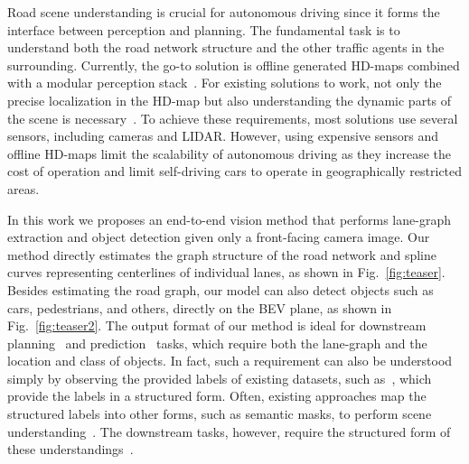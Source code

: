 \documentclass[10pt,twocolumn,letterpaper]{article}
\begin{document}
Road scene understanding is crucial for autonomous driving since it forms the interface between perception and planning. The fundamental task is to understand both the road network structure and the other traffic agents in the surrounding. Currently, the go-to solution is offline generated HD-maps combined with a modular perception stack~\cite{jaritz20202d,seif2016autonomous,ma2019exploiting,ravi2018real,casas2021mp3}. For existing solutions to work, not only the precise localization in the HD-map but also understanding the dynamic parts of the scene is necessary~\cite{ma2019exploiting,yang2018hdnet}. To achieve these requirements, most solutions use several sensors, including cameras and LIDAR. However, using expensive sensors and offline HD-maps limit the scalability of autonomous driving as they increase the cost of operation and limit self-driving cars to operate in geographically restricted areas.

In this work we proposes an end-to-end vision method that performs lane-graph extraction and object detection given only a front-facing camera image. Our method directly estimates the graph structure of the road network and spline curves representing centerlines of individual lanes, as shown in Fig.~\ref{fig:teaser}. Besides estimating the road graph, our model can also detect objects such as cars, pedestrians, and others, directly on the BEV plane, as shown in Fig.~\ref{fig:teaser2}. The output format of our method is ideal for downstream planning~\cite{DBLP:conf/rss/BansalKO19,chen2020learning} and prediction~\cite{cui2019multimodal,zaech2020action,hong2019rules,rella2021decoder} tasks, which require both the lane-graph and the location and class of objects. In fact, such a requirement can also be understood simply by observing the provided labels of existing datasets, such as~\cite{nuscenes2019}, which provide the labels in a structured form. Often, existing approaches map the structured labels into other forms, such as semantic masks, to perform scene understanding~\cite{garg2021semantics}. The downstream tasks, however, require the structured form of these understandings~\cite{liang2018end,paz2021tridentnet,liang2019convolutional,homayounfar2019dagmapper}. 
\end{document}
